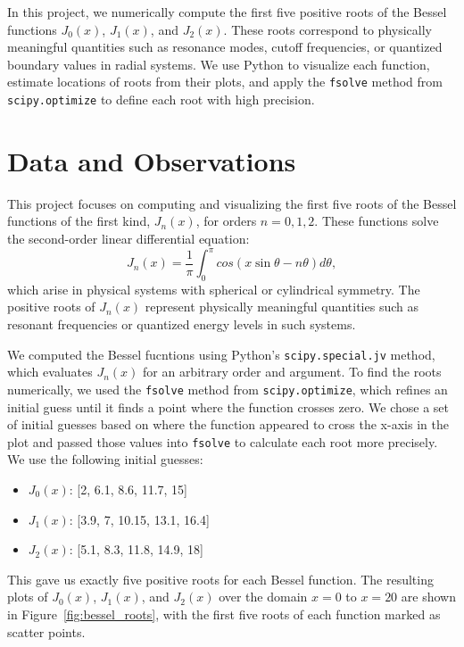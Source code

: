 \documentclass[linenumbers, RNAAS, trackchanges]{aastex631}
\begin{document}
\noindent In this project, we numerically compute the first five positive roots
of the Bessel functions $J_0(x)$, $J_1(x)$, and $J_2(x)$. These roots correspond
to physically meaningful quantities such as resonance modes, cutoff frequencies, 
or quantized boundary values in radial systems. We use Python to visualize each
function, estimate locations of roots from their plots, and apply the \texttt{fsolve}
method from \texttt{scipy.optimize} to define each root with high precision.


\section{Data and Observations} \label{sec:data}

This project focuses on computing and visualizing the first five roots of the
Bessel functions of the first kind, $J_n(x)$, for orders $n=0,1,2$. These
functions solve the second-order linear differential equation:
\begin{equation}
    J_n(x)=\frac{1}{\pi}\int_0^\pi cos(x\sin\theta-n\theta)d\theta,
\end{equation}
\noindent which arise in physical systems with spherical or cylindrical 
symmetry. The positive roots of $J_n(x)$ represent physically meaningful
quantities such as resonant frequencies or quantized energy levels in such
systems.

\noindent We computed the Bessel fucntions using Python's \texttt{scipy.special.jv}
method, which evaluates $J_n(x)$ for an arbitrary order and argument. To
find the roots numerically, we used the \texttt{fsolve} method from \texttt{scipy.optimize},
which refines an initial guess until it finds a point where the function crosses
zero. We chose a set of initial guesses based on where the function appeared to
cross the x-axis in the plot and passed those values into \texttt{fsolve} to
calculate each root more precisely. We use the following initial guesses:

\begin{itemize}
    \item $J_0(x)$: [2, 6.1, 8.6, 11.7, 15]
    \item $J_1(x)$: [3.9, 7, 10.15, 13.1, 16.4]
    \item $J_2(x)$: [5.1, 8.3, 11.8, 14.9, 18]
\end{itemize}

\noindent This gave us exactly five positive roots for each Bessel function. The 
resulting plots of $J_0(x)$, $J_1(x)$, and $J_2(x)$ over the domain $x=0$ to
$x=20$ are shown in Figure~\ref{fig:bessel_roots}, with the first five roots of
each function marked as scatter points.
\end{document}

